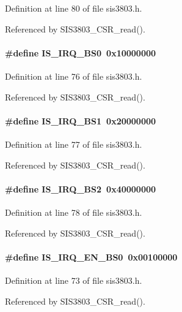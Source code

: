 Definition at line 80 of file sis3803.h.

Referenced by SIS3803\_\-CSR\_\-read().
\paragraph[{IS\_\-IRQ\_\-BS0}]{\setlength{\rightskip}{0pt plus 5cm}\#define IS\_\-IRQ\_\-BS0~0x10000000}\hfill\label{sis3803_8h_a6ec2ed9bb7335f0d72697f84d1d3aec5}


Definition at line 76 of file sis3803.h.

Referenced by SIS3803\_\-CSR\_\-read().
\paragraph[{IS\_\-IRQ\_\-BS1}]{\setlength{\rightskip}{0pt plus 5cm}\#define IS\_\-IRQ\_\-BS1~0x20000000}\hfill\label{sis3803_8h_a482302a61b096e76d0ecad77bee45107}


Definition at line 77 of file sis3803.h.

Referenced by SIS3803\_\-CSR\_\-read().
\paragraph[{IS\_\-IRQ\_\-BS2}]{\setlength{\rightskip}{0pt plus 5cm}\#define IS\_\-IRQ\_\-BS2~0x40000000}\hfill\label{sis3803_8h_a88426e9f3876ee32807d14a7e449dc19}


Definition at line 78 of file sis3803.h.

Referenced by SIS3803\_\-CSR\_\-read().
\paragraph[{IS\_\-IRQ\_\-EN\_\-BS0}]{\setlength{\rightskip}{0pt plus 5cm}\#define IS\_\-IRQ\_\-EN\_\-BS0~0x00100000}\hfill\label{sis3803_8h_a233a43bcb5b34167398182aa285d4e13}


Definition at line 73 of file sis3803.h.

Referenced by SIS3803\_\-CSR\_\-read().
